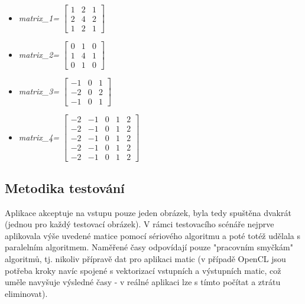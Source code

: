 \documentclass[10pt,a4paper]{article}
\begin{document}
\begin{itemize}
	\item  \textit{matrix\_1=}
		\begin{math}
		\begin{bmatrix}
		  1 & 2 & 1 \\
		  2 & 4 & 2 \\
		  1 & 2 & 1 
		 \end{bmatrix}
		\end{math} 

	\item \textit{matrix\_2=}
		\begin{math}
		\begin{bmatrix}
		  0 & 1 & 0 \\
		  1 & 4 & 1 \\
		  0 & 1 & 0 
		 \end{bmatrix}
		\end{math} 
		
	\item \textit{matrix\_3=}
		\begin{math}
		\begin{bmatrix}
		  -1 & 0 & 1 \\
		  -2 & 0 & 2 \\
		  -1 & 0 & 1 
		 \end{bmatrix}
		\end{math} 
		
	\item \textit{matrix\_4=}
		\begin{math}
		\begin{bmatrix}
		  -2 & -1 & 0 & 1 & 2 \\
		  -2 & -1 & 0 & 1 & 2 \\
		  -2 & -1 & 0 & 1 & 2 \\
		  -2 & -1 & 0 & 1 & 2 \\
		  -2 & -1 & 0 & 1 & 2 
		 \end{bmatrix}
		\end{math} 
\end{itemize}

\subsection{Metodika testování}

Aplikace akceptuje na vstupu pouze jeden obrázek, byla tedy spuštěna dvakrát (jednou pro každý testovací obrázek). V rámci testovacího scénáře nejprve aplikovala výše uvedené matice pomocí sériového algoritmu a poté totéž udělala s paralelním algoritmem. Naměřené časy odpovídají pouze "pracovním smyčkám" algoritmů, tj. nikoliv přípravě dat pro aplikaci matic (v případě OpenCL jsou potřeba kroky navíc spojené s vektorizací vstupních a výstupních matic, což uměle navyšuje výsledné časy - v reálné aplikaci lze s tímto počítat a ztrátu eliminovat).
\end{document}
